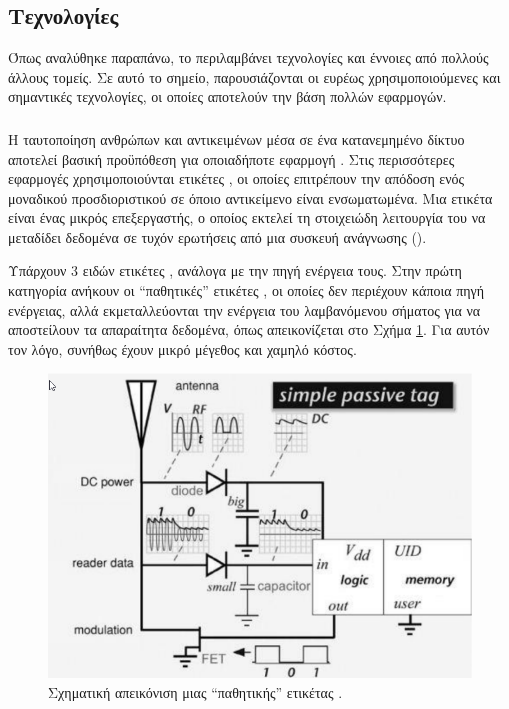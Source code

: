 \subsection{Τεχνολογίες}
Όπως αναλύθηκε παραπάνω, το  περιλαμβάνει τεχνολογίες και έννοιες από πολλούς άλλους τομείς. Σε αυτό το σημείο, παρουσιάζονται οι ευρέως χρησιμοποιούμενες και σημαντικές τεχνολογίες, οι οποίες αποτελούν την βάση πολλών  εφαρμογών.
\subsubsection{}
Η ταυτοποίηση ανθρώπων και αντικειμένων μέσα σε ένα κατανεμημένο δίκτυο αποτελεί βασική προϋπόθεση για οποιαδήποτε εφαρμογή . Στις περισσότερες εφαρμογές χρησιμοποιούνται ετικέτες , οι οποίες επιτρέπουν την απόδοση ενός μοναδικού προσδιοριστικού σε όποιο αντικείμενο είναι ενσωματωμένα. Μια ετικέτα  είναι ένας μικρός επεξεργαστής, ο οποίος εκτελεί τη στοιχειώδη λειτουργία του να μεταδίδει δεδομένα σε τυχόν ερωτήσεις από μια συσκευή ανάγνωσης ().
\par
Υπάρχουν 3 ειδών ετικέτες , ανάλογα με την πηγή ενέργεια τους.
Στην πρώτη κατηγορία ανήκουν οι ``παθητικές'' ετικέτες , οι οποίες δεν περιέχουν κάποια πηγή ενέργειας, αλλά εκμεταλλεύονται την ενέργεια του λαμβανόμενου σήματος για να αποστείλουν τα απαραίτητα δεδομένα, όπως απεικονίζεται στο Σχήμα \ref{passRFID}.
Για αυτόν τον λόγο, συνήθως έχουν μικρό μέγεθος και χαμηλό κόστος.
\begin{figure}[h!]
\includegraphics[scale=0.7]{images/pass_RFID.png}
\centering
\caption{Σχηματική απεικόνιση μιας ``παθητικής'' ετικέτας \cite{rfidpass}.}
\label{passRFID}
\end{figure}
